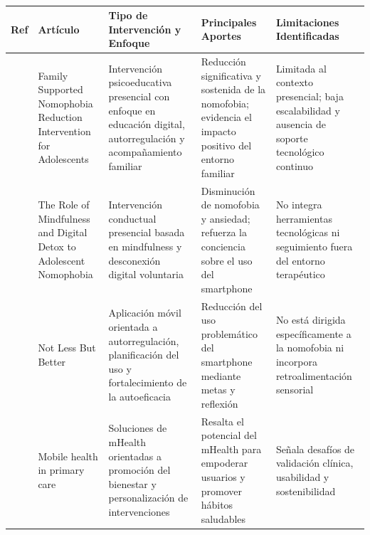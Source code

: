
{
    \footnotesize
    \renewcommand{\arraystretch}{1.1}

    \begin{longtable}{c p{3cm} p{3cm} p{3cm} p{3cm}}
        
        \caption{}
        \label{tab::estadoArteNomofobia} \\

        \hline
        
        \textbf{Ref} & \textbf{Artículo} & \textbf{Tipo de Intervención y Enfoque} & \textbf{Principales Aportes} & \textbf{Limitaciones Identificadas} \\ \hline
        \endfirsthead

        \cite{CelikKucukKulaberoglu2024} & Family Supported Nomophobia Reduction Intervention for Adolescents & Intervención psicoeducativa presencial con enfoque en educación digital, autorregulación y acompañamiento familiar & Reducción significativa y sostenida de la nomofobia; evidencia el impacto positivo del entorno familiar & Limitada al contexto presencial; baja escalabilidad y ausencia de soporte tecnológico continuo \\ 

        \hline

        \cite{AiniBukhoriBakar2021} & The Role of Mindfulness and Digital Detox to Adolescent Nomophobia & Intervención conductual presencial basada en mindfulness y desconexión digital voluntaria & Disminución de nomofobia y ansiedad; refuerza la conciencia sobre el uso del smartphone & No integra herramientas tecnológicas ni seguimiento fuera del entorno terapéutico \\

        \hline

        \cite{Keller2021} & Not Less But Better & Aplicación móvil orientada a autorregulación, planificación del uso y fortalecimiento de la autoeficacia &Reducción del uso problemático del smartphone mediante metas y reflexión & No está dirigida específicamente a la nomofobia ni incorpora retroalimentación sensorial \\

        \hline

        \cite{ALOS2024102900} & Mobile health in primary care & Soluciones de mHealth orientadas a promoción del bienestar y personalización de intervenciones & Resalta el potencial del mHealth para empoderar usuarios y promover hábitos saludables & Señala desafíos de validación clínica, usabilidad y sostenibilidad \\


\end{longtable}}
